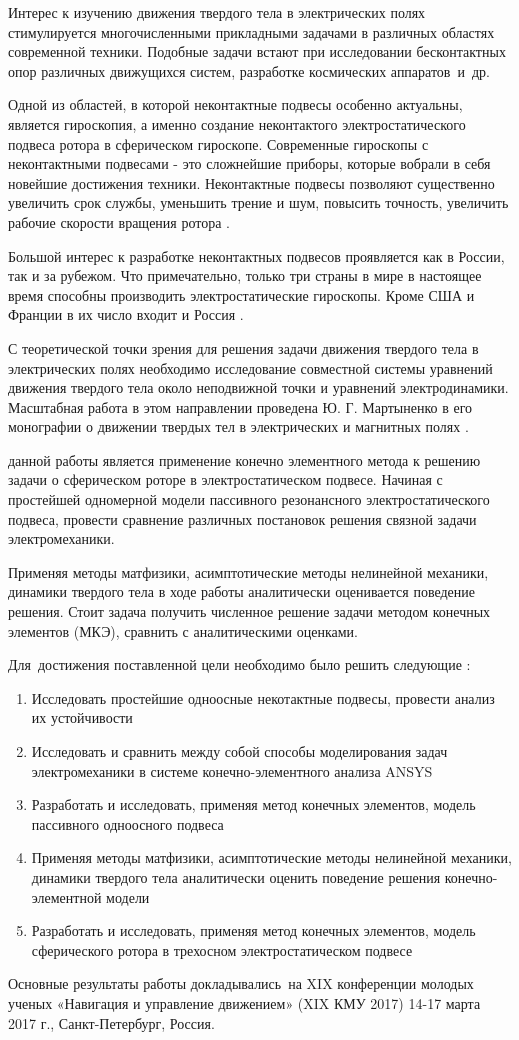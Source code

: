 
{\actuality}
Интерес к изучению движения твердого тела в электрических полях стимулируется многочисленными прикладными задачами в различных областях современной техники. Подобные задачи встают при исследовании бесконтактных опор различных движущихся систем, разработке космических аппаратов~и~др.

Одной из областей, в которой неконтактные подвесы особенно актуальны, является гироскопия, а именно создание неконтактого электростатического подвеса ротора в сферическом гироскопе. Современные гироскопы с неконтактными подвесами - это сложнейшие приборы, которые вобрали в себя новейшие достижения техники. Неконтактные подвесы позволяют существенно увеличить срок службы, уменьшить трение и шум, повысить точность, увеличить рабочие скорости вращения ротора \cite{Electropribor}.

Большой интерес к разработке неконтактных подвесов проявляется как в России, так и за рубежом. Что примечательно, только три страны в мире в настоящее время способны производить электростатические гироскопы. Кроме США и Франции в их число входит и Россия \cite{Electropribor}.

С теоретической точки зрения для решения задачи движения твердого тела в электрических полях необходимо исследование совместной системы уравнений движения твердого тела около неподвижной точки и уравнений электродинамики. Масштабная работа в этом направлении проведена Ю. Г. Мартыненко в его монографии о движении твердых тел в электрических и магнитных полях \cite{Martynenko}. 


{\aim} данной работы является применение конечно элементного метода к решению задачи о сферическом роторе в электростатическом подвесе.
Начиная с простейшей одномерной модели пассивного резонансного электростатического подвеса, провести сравнение различных постановок решения связной задачи электромеханики.

Применяя методы матфизики, асимптотические методы нелинейной механики, динамики твердого тела в ходе работы аналитически оценивается поведение решения. Стоит задача получить численное решение задачи методом конечных элементов (МКЭ), сравнить с аналитическими оценками.


Для~достижения поставленной цели необходимо было решить следующие {\tasks}:
\begin{enumerate}
  \item Исследовать простейшие одноосные некотактные подвесы, провести анализ их устойчивости
  \item Исследовать и сравнить между собой способы моделирования задач электромеханики в системе конечно-элементного анализа ANSYS
  \item Разработать и исследовать, применяя метод конечных элементов,  модель пассивного одноосного подвеса
  \item Применяя методы матфизики, асимптотические методы нелинейной механики, динамики твердого тела аналитически оценить поведение решения конечно-элементной модели
  \item Разработать и исследовать, применяя метод конечных элементов,  модель сферического ротора в трехосном электростатическом подвесе 
\end{enumerate}

{\probation}
Основные результаты работы докладывались~на XIX конференции молодых ученых «Навигация и управление движением» (XIX КМУ 2017) 14-17 марта 2017 г., Санкт-Петербург, Россия.

